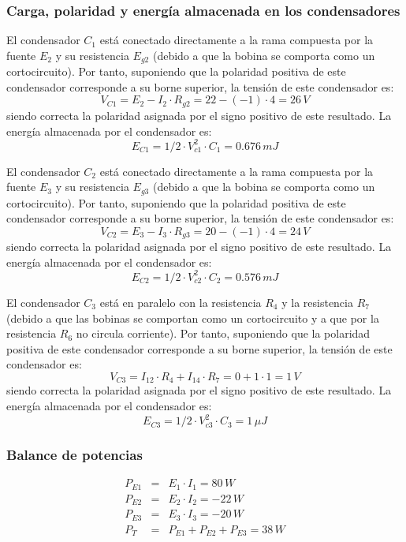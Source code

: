 \documentclass[10pt]{article}
\begin{document}
\subsubsection*{Carga, polaridad y energía almacenada en los condensadores}


El condensador $C_{1}$ está conectado directamente a la rama compuesta
por la fuente $E_{2}$ y su resistencia $E_{g2}$ (debido a que la
bobina se comporta como un cortocircuito). Por tanto, suponiendo que
la polaridad positiva de este condensador corresponde a su borne superior,
la tensión de este condensador es:
\[
V_{C1}=E_{2}-I_{2}\cdot R_{g2}=22-(-1)\cdot4=26\, V
\]
siendo correcta la polaridad asignada por el signo positivo de este
resultado. La energía almacenada por el condensador es:
\[
E_{C1}=1/2\cdot V_{c1}^{2}\cdot C_{1}=0.676\, mJ
\]

El condensador $C_{2}$ está conectado directamente a la rama compuesta
por la fuente $E_{3}$ y su resistencia $E_{g3}$ (debido a que la
bobina se comporta como un cortocircuito). Por tanto, suponiendo que
la polaridad positiva de este condensador corresponde a su borne superior,
la tensión de este condensador es:
\[
V_{C2}=E_{3}-I_{3}\cdot R_{g3}=20-(-1)\cdot4=24\, V
\]
siendo correcta la polaridad asignada por el signo positivo de este
resultado. La energía almacenada por el condensador es:
\[
E_{C2}=1/2\cdot V_{c2}^{2}\cdot C_{2}=0.576\, mJ
\]


El condensador $C_{3}$ está en paralelo con la resistencia $R_{4}$
y la resistencia $R_{7}$ (debido a que las bobinas se comportan como
un cortocircuito y a que por la resistencia $R_{6}$ no circula corriente).
Por tanto, suponiendo que la polaridad positiva de este condensador
corresponde a su borne superior, la tensión de este condensador es:
\[
V_{C3}=I_{12}\cdot R_{4}+I_{14}\cdot R_{7}=0+1\cdot1=1\, V
\]
siendo correcta la polaridad asignada por el signo positivo de este
resultado. La energía almacenada por el condensador es:
\[
E_{C3}=1/2\cdot V_{c3}^{2}\cdot C_{3}=1\,\mu J
\]



\subsubsection*{Balance de potencias}


\begin{eqnarray*}
P_{E1} & = & E_{1}\cdot I_{1}=80\, W\\
P_{E2} & = & E_{2}\cdot I_{2}=-22\, W\\
P_{E3} & = & E_{3}\cdot I_{3}=-20\, W\\
P_{T} & = & P_{E1}+P_{E2}+P_{E3}=38\, W
\end{eqnarray*}
\end{document}
